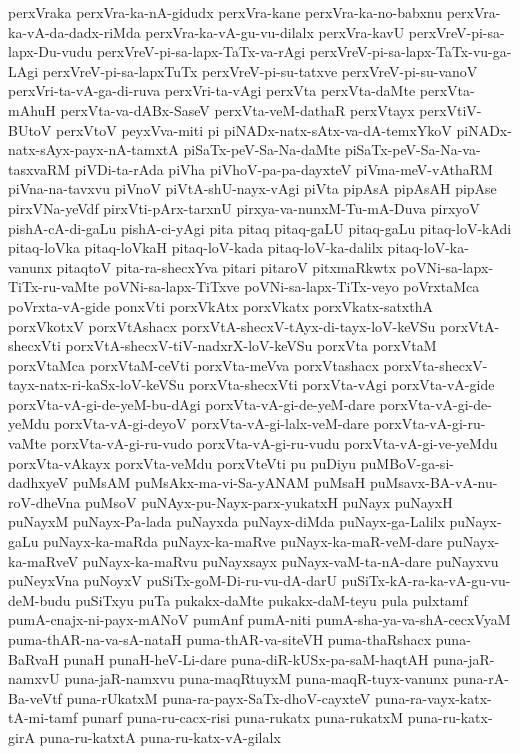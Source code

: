 {perxVraka
perxVra-ka-nA-gidudx
perxVra-kane
perxVra-ka-no-babxnu
perxVra-ka-vA-da-dadx-riMda
perxVra-ka-vA-gu-vu-dilalx
perxVra-kavU
perxVreV-pi-sa-lapx-Du-vudu
perxVreV-pi-sa-lapx-TaTx-va-rAgi
perxVreV-pi-sa-lapx-TaTx-vu-ga-LAgi
perxVreV-pi-sa-lapxTuTx
perxVreV-pi-su-tatxve
perxVreV-pi-su-vanoV
perxVri-ta-vA-ga-di-ruva
perxVri-ta-vAgi
perxVta
perxVta-daMte
perxVta-mAhuH
perxVta-va-dABx-SaseV
perxVta-veM-dathaR
perxVtayx
perxVtiV-BUtoV
perxVtoV
peyxVva-miti
pi
piNADx-natx-sAtx-va-dA-temxYkoV
piNADx-natx-sAyx-payx-nA-tamxtA
piSaTx-peV-Sa-Na-daMte
piSaTx-peV-Sa-Na-va-tasxvaRM
piVDi-ta-rAda
piVha
piVhoV-pa-pa-dayxteV
piVma-meV-vAthaRM
piVna-na-tavxvu
piVnoV
piVtA-shU-nayx-vAgi
piVta
pipAsA
pipAsAH
pipAse
pirxVNa-yeVdf
pirxVti-pArx-tarxnU
pirxya-va-nunxM-Tu-mA-Duva
pirxyoV
pishA-cA-di-gaLu
pishA-ci-yAgi
pita
pitaq
pitaq-gaLU
pitaq-gaLu
pitaq-loV-kAdi
pitaq-loVka
pitaq-loVkaH
pitaq-loV-kada
pitaq-loV-ka-dalilx
pitaq-loV-ka-vanunx
pitaqtoV
pita-ra-shecxYva
pitari
pitaroV
pitxmaRkwtx
poVNi-sa-lapx-TiTx-ru-vaMte
poVNi-sa-lapx-TiTxve
poVNi-sa-lapx-TiTx-veyo
poVrxtaMca
poVrxta-vA-gide
ponxVti
porxVkAtx
porxVkatx
porxVkatx-satxthA
porxVkotxV
porxVtAshacx
porxVtA-shecxV-tAyx-di-tayx-loV-keVSu
porxVtA-shecxVti
porxVtA-shecxV-tiV-nadxrX-loV-keVSu
porxVta
porxVtaM
porxVtaMca
porxVtaM-ceVti
porxVta-meVva
porxVtashacx
porxVta-shecxV-tayx-natx-ri-kaSx-loV-keVSu
porxVta-shecxVti
porxVta-vAgi
porxVta-vA-gide
porxVta-vA-gi-de-yeM-bu-dAgi
porxVta-vA-gi-de-yeM-dare
porxVta-vA-gi-de-yeMdu
porxVta-vA-gi-deyoV
porxVta-vA-gi-lalx-veM-dare
porxVta-vA-gi-ru-vaMte
porxVta-vA-gi-ru-vudo
porxVta-vA-gi-ru-vudu
porxVta-vA-gi-ve-yeMdu
porxVta-vAkayx
porxVta-veMdu
porxVteVti
pu
puDiyu
puMBoV-ga-si-dadhxyeV
puMsAM
puMsAkx-ma-vi-Sa-yANAM
puMsaH
puMsavx-BA-vA-nu-roV-dheVna
puMsoV
puNAyx-pu-Nayx-parx-yukatxH
puNayx
puNayxH
puNayxM
puNayx-Pa-lada
puNayxda
puNayx-diMda
puNayx-ga-Lalilx
puNayx-gaLu
puNayx-ka-maRda
puNayx-ka-maRve
puNayx-ka-maR-veM-dare
puNayx-ka-maRveV
puNayx-ka-maRvu
puNayxsayx
puNayx-vaM-ta-nA-dare
puNayxvu
puNeyxVna
puNoyxV
puSiTx-goM-Di-ru-vu-dA-darU
puSiTx-kA-ra-ka-vA-gu-vu-deM-budu
puSiTxyu
puTa
pukakx-daMte
pukakx-daM-teyu
pula
pulxtamf
pumA-cnajx-ni-payx-mANoV
pumAnf
pumA-niti
pumA-sha-ya-va-shA-cecxVyaM
puma-thAR-na-va-sA-nataH
puma-thAR-va-siteVH
puma-thaRshacx
puna-BaRvaH
punaH
punaH-heV-Li-dare
puna-diR-kUSx-pa-saM-haqtAH
puna-jaR-namxvU
puna-jaR-namxvu
puna-maqRtuyxM
puna-maqR-tuyx-vanunx
puna-rA-Ba-veVtf
puna-rUkatxM
puna-ra-payx-SaTx-dhoV-cayxteV
puna-ra-vayx-katx-tA-mi-tamf
punarf
puna-ru-cacx-risi
puna-rukatx
puna-rukatxM
puna-ru-katx-girA
puna-ru-katxtA
puna-ru-katx-vA-gilalx
}
